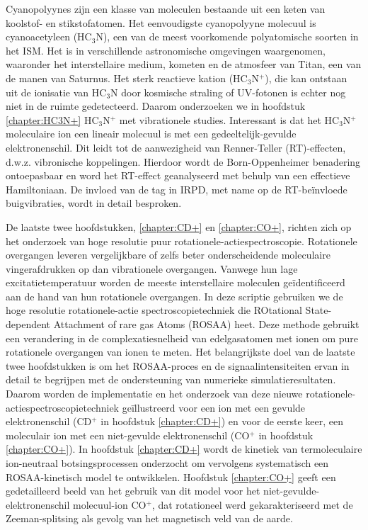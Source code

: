 {Cyanopolyynes zijn een klasse van moleculen bestaande uit een keten van koolstof- en stikstofatomen. Het eenvoudigste cyanopolyyne molecuul is cyanoacetyleen (HC$_3$N), een van de meest voorkomende polyatomische soorten in het ISM. Het is in verschillende astronomische omgevingen waargenomen, waaronder het interstellaire medium, kometen en de atmosfeer van Titan, een van de manen van Saturnus. Het sterk reactieve kation (HC$_3$N$^+$), die kan ontstaan uit de ionisatie van HC$_3$N door kosmische straling of UV-fotonen is echter nog niet in de ruimte gedetecteerd. Daarom onderzoeken we in hoofdstuk \ref{chapter:HC3N+} HC$_3$N$^+$ met vibrationele studies. Interessant is dat het HC$_3$N$^+$ moleculaire ion een lineair molecuul is met een gedeeltelijk-gevulde elektronenschil. Dit leidt tot de aanwezigheid van Renner-Teller (RT)-effecten, d.w.z. vibronische koppelingen. Hierdoor wordt de Born-Oppenheimer benadering ontoepasbaar en word het RT-effect geanalyseerd met behulp van een effectieve Hamiltoniaan. De invloed van de tag in IRPD, met name op de RT-be\"{i}nvloede buigvibraties, wordt in detail besproken.

De laatste twee hoofdstukken, \ref{chapter:CD+} en \ref{chapter:CO+}, richten zich op het onderzoek van hoge resolutie puur 
rotationele-actiespectroscopie. Rotationele overgangen leveren vergelijkbare of zelfs beter onderscheidende moleculaire 
vingerafdrukken op dan vibrationele overgangen. Vanwege hun lage excitatietemperatuur worden de meeste interstellaire 
moleculen geïdentificeerd aan de hand van hun rotationele overgangen. In deze scriptie gebruiken we de hoge resolutie 
rotationele-actie spectroscopietechniek die ROtational State-dependent Attachment of rare gas Atoms (ROSAA) heet. Deze 
methode gebruikt een verandering in de complexatiesnelheid van edelgasatomen met ionen om pure rotationele overgangen 
van ionen te meten. Het belangrijkste doel van de laatste twee hoofdstukken is om het ROSAA-proces en de 
signaalintensiteiten ervan in detail te begrijpen met de ondersteuning van numerieke simulatieresultaten. Daarom worden 
de implementatie en het onderzoek van deze nieuwe rotationele-actiespectroscopietechniek geïllustreerd voor een ion met 
een gevulde elektronenschil (CD$^+$ in hoofdstuk \ref{chapter:CD+}) en voor de eerste keer, een moleculair ion met een 
niet-gevulde elektronenschil (CO$^+$ in hoofdstuk \ref{chapter:CO+}). In hoofdstuk \ref{chapter:CD+} wordt de kinetiek 
van termoleculaire ion-neutraal botsingsprocessen onderzocht om vervolgens systematisch een ROSAA-kinetisch model te 
ontwikkelen. Hoofdstuk \ref{chapter:CO+} geeft een gedetailleerd beeld van het gebruik van dit model voor het 
niet-gevulde-elektronenschil molecuul-ion CO$^+$, dat rotationeel werd gekarakteriseerd met de Zeeman-splitsing als 
gevolg van het magnetisch veld van de aarde.

}
